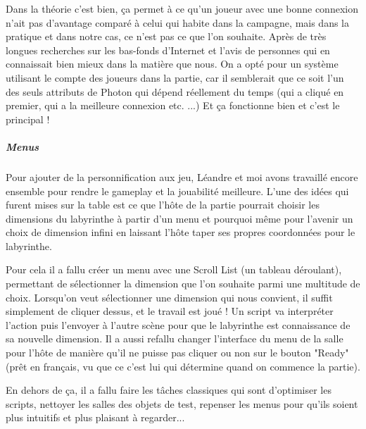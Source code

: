 \documentclass{article}
\begin{document}
Dans la théorie c'est bien, ça permet à ce qu'un joueur avec une bonne connexion n'ait pas d'avantage comparé à celui qui habite dans la campagne, mais dans la pratique et dans notre cas, ce n'est pas ce que l'on souhaite. Après de très longues recherches sur les bas-fonds d'Internet et l'avis de personnes qui en connaissait bien mieux dans la matière que nous. On a opté pour un système utilisant le compte des joueurs dans la partie, car il semblerait que ce soit l'un des seuls attributs de Photon qui dépend réellement du temps (qui a cliqué en premier, qui a la meilleure connexion etc. ...) Et ça fonctionne bien et c'est le principal !


\subparagraph{Menus}

Pour ajouter de la personnification aux jeu, Léandre et moi avons travaillé encore ensemble pour rendre le gameplay et la jouabilité meilleure. L'une des idées qui furent mises sur la table est ce que l'hôte de la partie pourrait choisir les dimensions du labyrinthe à partir d’un menu et pourquoi même pour l'avenir un choix de dimension infini en laissant l'hôte taper ses propres coordonnées pour le labyrinthe. 

Pour cela il a fallu créer un menu avec une Scroll List (un tableau déroulant), permettant de sélectionner la dimension que l'on souhaite parmi une multitude de choix. Lorsqu'on veut sélectionner une dimension qui nous convient, il suffit simplement de cliquer dessus, et le travail est joué ! Un script va interpréter l'action puis l'envoyer à l'autre scène pour que le labyrinthe est connaissance de sa nouvelle dimension. Il a aussi refallu changer l'interface du menu de la salle pour l'hôte de manière qu'il ne puisse pas cliquer ou non sur le bouton "Ready" (prêt en français, vu que ce c'est lui qui détermine quand on commence la partie).
 
En dehors de ça, il a fallu faire les tâches classiques qui sont d'optimiser les scripts, nettoyer les salles des objets de test, repenser les menus pour qu'ils soient plus intuitifs et plus plaisant à regarder...




\end{document}

